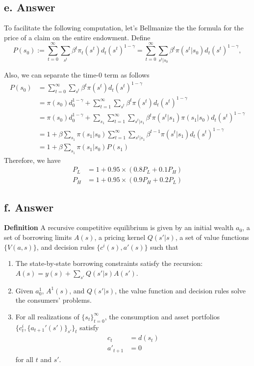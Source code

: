 \documentclass[11pt]{article}
\theoremstyle{definition}
\theoremstyle{boldtitle} %
\numberwithin{equation}{section}
\numberwithin{figure}{section}
\numberwithin{table}{section}
\begin{document}
\subsection{e. Answer}
To facilitate the following computation, let's Bellmanize the 
the formula for the price of a claim on the entire endowment.
Define 
\[
P(s_0) := \sum_{t=0}^\infty \sum_{s^t} \beta^t \pi_t(s^t) d_t(s^t)^{1-\gamma} = \sum_{t=0}^\infty \sum_{s^t|s_0} \beta^t \pi(s^t|s_0) d_t(s^t)^{1-\gamma},
\]

Also, we can separate the time-0 term as follows 
\begin{align*}
    P(s_0) & = \sum_{t=0}^\infty \sum_{s^t} \beta^t \pi(s^t) d_t(s^t)^{1-\gamma} \\
    & = \pi(s_0) d_0^{1 - \gamma} + \sum_{t=1}^\infty \sum_{s^t} \beta^t \pi(s^t) d_t(s^t)^{1-\gamma} \\
    & = \pi(s_0) d_0^{1 - \gamma} + \sum_{s_1}\sum_{t=1}^\infty \sum_{s^t|s_1} \beta^t \pi(s^t|s_1) \pi(s_1|s_0) d_t(s^t)^{1-\gamma} \\ 
    & = 1 + \beta \sum_{s_1} \pi(s_1|s_0) \sum_{t=1}^\infty \sum_{s^t|s_1} \beta^{t-1} \pi(s^t|s_1)  d_t(s^t)^{1-\gamma} \\
    & = 1 + \beta \sum_{s_1} \pi(s_1|s_0) P(s_1)
\end{align*}
Therefore, we have 
\begin{align*}
    P_L & = 1 + 0.95 \times (0.8 P_L + 0.1 P_H) \\
    P_H & = 1 + 0.95 \times (0.9 P_H + 0.2 P_L)
\end{align*}

\subsection{f. Answer}

\noindent \textbf{Definition}
A recursive competitive equilibrium is given by 
an initial wealth $a_0$, a set of borrowing limits 
$A(s)$, a pricing kernel $Q(s'|s)$, 
a set of value functions $\{V(a, s) \}$, and 
decision rules $\{c^i(s), {a'}(s) \}$ such that 
\begin{enumerate}
    \item The state-by-state borrowing constraints satisfy the recursion: $  A(s) = y(s) + \sum_{s'} Q(s'|s)  A(s')$.
    \item Given $a^1_0$, $A^1(s)$, and $Q(s'|s)$, the value function and decision rules solve the consumers' problems.
    \item For all realizations of $\{s_t \}_{t=0}^\infty$, the consumption and asset portfolios $\{ c^i_t, \{{{a_{t+1}'}}(s')\}_{s'}\}_t$ 
    satisfy 
    \begin{align*}
        c_t & = d(s_t)  \\
        {a'_{t+1}} & = 0
    \end{align*}
    for all $t$ and $s'$.
\end{enumerate}
\end{document}
